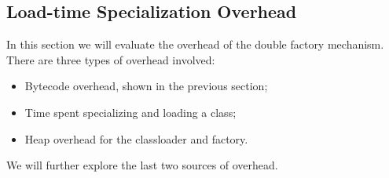 \subsection{Load-time Specialization Overhead}
\label{subsec-eval-specialization}

In this section we will evaluate the overhead of the double factory mechanism. There are three types of overhead involved:
\begin{itemize}
  \item Bytecode overhead, shown in the previous section;
  \item Time spent specializing and loading a class;
  \item Heap overhead for the classloader and factory.
\end{itemize}

We will further explore the last two sources of overhead.

